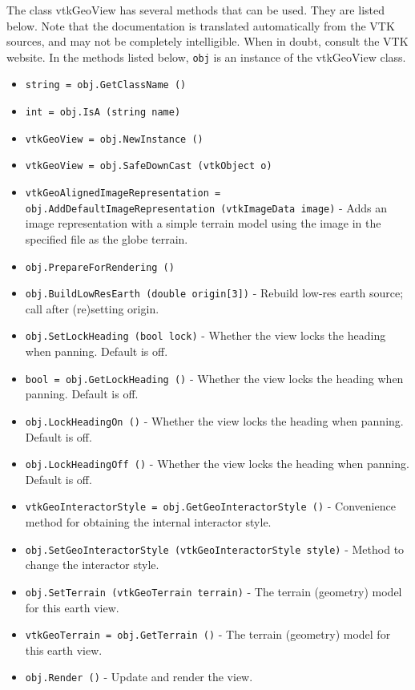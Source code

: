 The class vtkGeoView has several methods that can be used.
  They are listed below.
Note that the documentation is translated automatically from the VTK sources,
and may not be completely intelligible.  When in doubt, consult the VTK website.
In the methods listed below, \verb|obj| is an instance of the vtkGeoView class.
\begin{itemize}
\item  \verb|string = obj.GetClassName ()|

\item  \verb|int = obj.IsA (string name)|

\item  \verb|vtkGeoView = obj.NewInstance ()|

\item  \verb|vtkGeoView = obj.SafeDownCast (vtkObject o)|

\item  \verb|vtkGeoAlignedImageRepresentation = obj.AddDefaultImageRepresentation (vtkImageData image)| -  Adds an image representation with a simple terrain model using
 the image in the specified file as the globe terrain.

\item  \verb|obj.PrepareForRendering ()|

\item  \verb|obj.BuildLowResEarth (double origin[3])| -  Rebuild low-res earth source; call after (re)setting origin.

\item  \verb|obj.SetLockHeading (bool lock)| -  Whether the view locks the heading when panning.
 Default is off.

\item  \verb|bool = obj.GetLockHeading ()| -  Whether the view locks the heading when panning.
 Default is off.

\item  \verb|obj.LockHeadingOn ()| -  Whether the view locks the heading when panning.
 Default is off.

\item  \verb|obj.LockHeadingOff ()| -  Whether the view locks the heading when panning.
 Default is off.

\item  \verb|vtkGeoInteractorStyle = obj.GetGeoInteractorStyle ()| -  Convenience method for obtaining the internal interactor style.

\item  \verb|obj.SetGeoInteractorStyle (vtkGeoInteractorStyle style)| -  Method to change the interactor style.

\item  \verb|obj.SetTerrain (vtkGeoTerrain terrain)| -  The terrain (geometry) model for this earth view.

\item  \verb|vtkGeoTerrain = obj.GetTerrain ()| -  The terrain (geometry) model for this earth view.

\item  \verb|obj.Render ()| -  Update and render the view.

\end{itemize}
